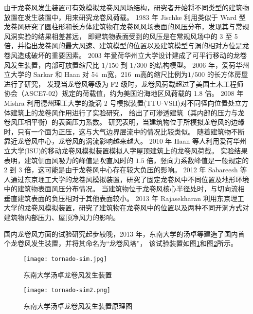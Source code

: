 由于龙卷风发生装置可有效模拟龙卷风风场结构，研究者开始将不同类型的建筑物放置在发生装置中，用来研究龙卷风荷载。
1983 年 Jischke \cite{jischke1983laboratory}利用类似于 Ward 型龙卷风研究了圆柱形和长方体建筑物在龙卷风风场表面的风压分布，发现其与常规风洞实验的结果相差甚远，
即建筑物表面受到的风压是在常规风场中的 3 至 5 倍，并指出龙卷风的最大风速、建筑模型的位置以及建筑模型与涡的相对方位是龙卷风造成破坏的重要因素。
2003 年爱荷华州立大学设计建成了可平行移动的龙卷风发生装置，内部可放置缩尺比 $1/150$ 到 $1/300$ 的结构模型。
2006 年，爱荷华州立大学的 Sarkar 和 Haan \cite{haan2009tornado}对 \SI{54}{m}宽，\SI{216}{m}高的缩尺比例为$1/500$ 的长方体房屋进行了研究，
发现当龙卷风等级为 F2 级时，龙卷风荷载超过了美国土木工程师协会（ASCE7-02）规定的荷载值，约为美国沿海地区风荷载的 1.8 倍。
2008 年 Mishra \cite{mishra2008physical}利用德州理工大学的漩涡 2 号模拟装置(TTU-VSII)对不同径向位置处立方体建筑上的龙卷风作用进行了实验研究，
给出了可渗透建筑（其内部的压力与龙卷风压相平衡）的表面压力系数。
研究表明，当建筑物位于所模拟龙卷风的边缘时，只有一个面为正压，这与大气边界层流中的情况比较类似。
随着建筑物不断靠近龙卷风中心，龙卷风的涡流影响越来越大。
2010 年 Haan \cite{haan2009tornado}等人利用爱荷华州立大学(ISU)的移动龙卷风模拟装置模拟人字屋顶建筑上的龙卷风荷载。
实验结果表明，建筑侧面风吸力的峰值是吹直风时的 $1.5$ 倍，竖向力系数峰值是一般规定的 $2$ 到 $3$ 倍，这可能是由于龙卷风中心存在较大负压的影响。
2012 年 Sabareesh 等人\cite{sabareesh2012dependence}通过东京理工大学的龙卷风模拟装置，研究了固定龙卷风中不同位置及地形环境中的建筑物表面风压分布情况。
当建筑物位于龙卷风核心半径处时，与切向流相垂直建筑表面的负压相对于其他表面较小。
2013 年 Rajasekharan \cite{rajasekharan2013characteristics}利用东京理工大学的龙卷风模拟装置，研究了建筑物在龙卷风中的位置以及两种不同开洞方式对建筑物内部压力、屋顶净风力的影响。

国内龙卷风方面的试验研究起步较晚，2013 年，东南大学的汤卓等建造了国内首个龙卷风发生装置，并将其命名为“龙卷风塔”，
该试验装置如图\ref{fig:seu-tornado}和图\ref{fig:seu-tornado2}所示。
\begin{figure}[!htbp]
    \centering
    \texttt{[image: tornado-sim.jpg]}
    \caption{东南大学汤卓龙卷风发生装置}
    \label{fig:seu-tornado}
\end{figure}

\begin{figure}[!htbp]
    \centering
    \texttt{[image: tornado-sim2.png]}
    \caption{东南大学汤卓龙卷风发生装置原理图}
    \label{fig:seu-tornado2}
\end{figure}

